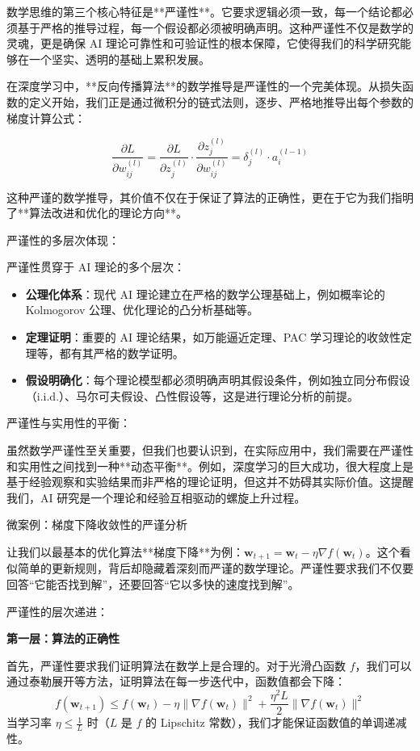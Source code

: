 数学思维的第三个核心特征是**严谨性**。它要求逻辑必须一致，每一个结论都必须基于严格的推导过程，每一个假设都必须被明确声明。这种严谨性不仅是数学的灵魂，更是确保 AI 理论可靠性和可验证性的根本保障，它使得我们的科学研究能够在一个坚实、透明的基础上累积发展。

在深度学习中，**反向传播算法**的数学推导是严谨性的一个完美体现。从损失函数的定义开始，我们正是通过微积分的链式法则，逐步、严格地推导出每个参数的梯度计算公式：

$$\frac{\partial L}{\partial w_{ij}^{(l)}} = \frac{\partial L}{\partial z_j^{(l)}} \cdot \frac{\partial z_j^{(l)}}{\partial w_{ij}^{(l)}} = \delta_j^{(l)} \cdot a_i^{(l-1)}$$

这种严谨的数学推导，其价值不仅在于保证了算法的正确性，更在于它为我们指明了**算法改进和优化的理论方向**。

严谨性的多层次体现：

严谨性贯穿于 AI 理论的多个层次：

\begin{itemize}
\item \textbf{公理化体系}：现代 AI 理论建立在严格的数学公理基础上，例如概率论的 Kolmogorov 公理、优化理论的凸分析基础等。
\item \textbf{定理证明}：重要的 AI 理论结果，如万能逼近定理、PAC 学习理论的收敛性定理等，都有其严格的数学证明。
\item \textbf{假设明确化}：每个理论模型都必须明确声明其假设条件，例如独立同分布假设（i.i.d.）、马尔可夫假设、凸性假设等，这是进行理论分析的前提。
\end{itemize}

严谨性与实用性的平衡：

虽然数学严谨性至关重要，但我们也要认识到，在实际应用中，我们需要在严谨性和实用性之间找到一种**动态平衡**。例如，深度学习的巨大成功，很大程度上是基于经验观察和实验结果而非严格的理论证明，但这并不妨碍其实际价值。这提醒我们，AI 研究是一个理论和经验互相驱动的螺旋上升过程。

微案例：梯度下降收敛性的严谨分析

让我们以最基本的优化算法**梯度下降**为例：$\mathbf{w}_{t+1} = \mathbf{w}_t - \eta \nabla f(\mathbf{w}_t)$。这个看似简单的更新规则，背后却隐藏着深刻而严谨的数学理论。严谨性要求我们不仅要回答“它能否找到解”，还要回答“它以多快的速度找到解”。

严谨性的层次递进：

\textbf{第一层：算法的正确性}

首先，严谨性要求我们证明算法在数学上是合理的。对于光滑凸函数 $f$，我们可以通过泰勒展开等方法，证明算法在每一步迭代中，函数值都会下降：
$$f(\mathbf{w}_{t+1}) \leq f(\mathbf{w}_t) - \eta \|\nabla f(\mathbf{w}_t)\|^2 + \frac{\eta^2 L}{2} \|\nabla f(\mathbf{w}_t)\|^2$$
当学习率 $\eta \leq \frac{1}{L}$ 时（$L$ 是 $f$ 的 Lipschitz 常数），我们才能保证函数值的单调递减性。

